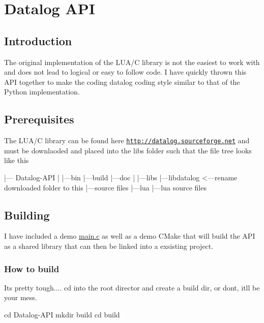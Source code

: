 \hypertarget{index_datalogapi_sec}{}\section{Datalog A\+PI}\label{index_datalogapi_sec}
\hypertarget{index_intro_sec}{}\subsection{Introduction}\label{index_intro_sec}
The original implementation of the L\+U\+A/C library is not the easiest to work with and does not lead to logical or easy to follow code. I have quickly thrown this A\+PI together to make the coding datalog coding style similar to that of the Python implementation. \hypertarget{index_prereq_sec}{}\subsection{Prerequisites}\label{index_prereq_sec}
The L\+U\+A/C library can be found here \href{http://datalog.sourceforge.net}{\tt http\+://datalog.\+sourceforge.\+net} and must be downlaoded and placed into the libs folder such that the file tree looks like this ~\newline
~\newline
 \begin{DoxyVerb}  |--- Datalog-API 
        | 
        |---bin
        |---build
        |---doc
        |
        |---libs
             |---libdatalog <---rename downloaded folder to this
                 |---source files
                 |---lua
                      |---lua source files
\end{DoxyVerb}
 \hypertarget{index_building_sec}{}\subsection{Building}\label{index_building_sec}
I have included a demo \hyperlink{main_8c}{main.\+c} as well as a demo C\+Make that will build the A\+PI as a shared library that can then be linked into a exsisting project.~\newline
 \hypertarget{index_build_cmds}{}\subsubsection{How to build}\label{index_build_cmds}
It\textquotesingle{}s pretty tough.... cd into the root director and create a build dir, or don\textquotesingle{}t, it\textquotesingle{}ll be your mess. \begin{DoxyVerb} cd Datalog-API
 mkdir build
 cd build\end{DoxyVerb}
